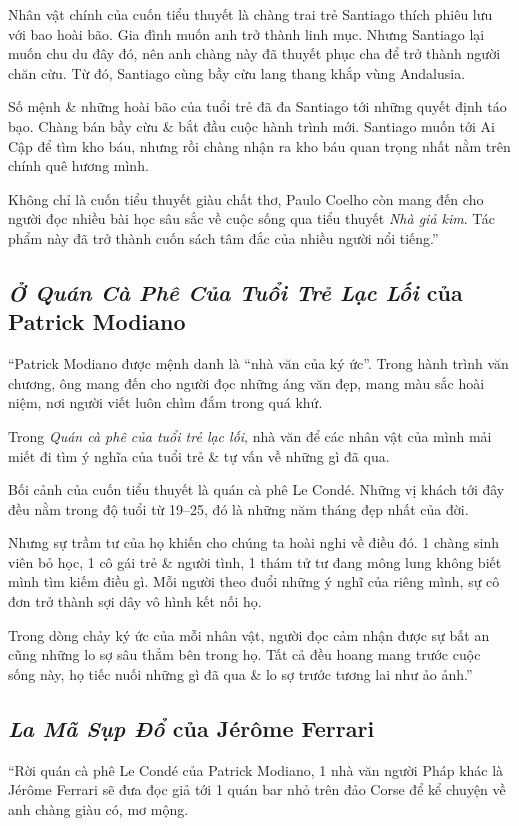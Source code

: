 \documentclass[oneside]{book}
\numberwithin{equation}{section}
\begin{document}
Nhân vật chính của cuốn tiểu thuyết là chàng trai trẻ Santiago thích phiêu lưu với bao hoài bão. Gia đình muốn anh trở thành linh mục. Nhưng Santiago lại muốn chu du đây đó, nên anh chàng này đã thuyết phục cha để trở thành người chăn cừu. Từ đó, Santiago cùng bầy cừu lang thang khắp vùng Andalusia.

Số mệnh \& những hoài bão của tuổi trẻ đã đa Santiago tới những quyết định táo bạo. Chàng bán bầy cừu \& bắt đầu cuộc hành trình mới. Santiago muốn tới Ai Cập để tìm kho báu, nhưng rồi chàng nhận ra kho báu quan trọng nhất nằm trên chính quê hương mình.

Không chỉ là cuốn tiểu thuyết giàu chất thơ, Paulo Coelho còn mang đến cho người đọc nhiều bài học sâu sắc về cuộc sống qua tiểu thuyết \textit{Nhà giả kim}. Tác phẩm này đã trở thành cuốn sách tâm đắc của nhiều người nổi tiếng.''

\subsection{\textit{Ở Quán Cà Phê Của Tuổi Trẻ Lạc Lối} của Patrick Modiano}
``Patrick Modiano được mệnh danh là ``nhà văn của ký ức''. Trong hành trình văn chương, ông mang đến cho người đọc những áng văn đẹp, mang màu sắc hoài niệm, nơi người viết luôn chìm đắm trong quá khứ.

Trong \textit{Quán cà phê của tuổi trẻ lạc lối}, nhà văn để các nhân vật của mình mải miết đi tìm ý nghĩa của tuổi trẻ \& tự vấn về những gì đã qua.

Bối cảnh của cuốn tiểu thuyết là quán cà phê Le Condé. Những vị khách tới đây đều nằm trong độ tuổi từ 19--25, đó là những năm tháng đẹp nhất của đời.

Nhưng sự trầm tư của họ khiến cho chúng ta hoài nghi về điều đó. 1 chàng sinh viên bỏ học, 1 cô gái trẻ \& người tình, 1 thám tử tư đang mông lung không biết mình tìm kiếm điều gì. Mỗi người theo đuổi những ý nghĩ của riêng mình, sự cô đơn trở thành sợi dây vô hình kết nối họ.

Trong dòng chảy ký ức của mỗi nhân vật, người đọc cảm nhận được sự bất an cũng những lo sợ sâu thẳm bên trong họ. Tất cả đều hoang mang trước cuộc sống này, họ tiếc nuối những gì đã qua \& lo sợ trước tương lai như ảo ảnh.''

\subsection{\textit{La Mã Sụp Đổ} của J\'er\^ome Ferrari}
``Rời quán cà phê Le Condé của Patrick Modiano, 1 nhà văn người Pháp khác là J\'er\^ome Ferrari sẽ đưa đọc giả tới 1 quán bar nhỏ trên đảo Corse để kể chuyện về anh chàng giàu có, mơ mộng.
\end{document}
